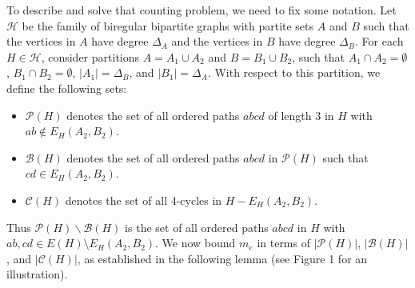 \documentclass[11pt]{amsart}
\newcommand{\pp}{\mathcal{P}}
\newcommand{\cc}{\mathcal{C}}
\newcommand{\bb}{\mathcal{B}}
\newcommand{\hh}{\mathcal{H}}
\begin{document}
To describe and solve that counting problem, we need to fix some notation. Let $\mathcal{H}$ be the family of biregular bipartite graphs with partite sets $A$ and $B$ such that the vertices in $A$ have degree  $\Delta_A$ and the vertices in $B$ have degree $\Delta_B$. For each $H\in \hh$, consider partitions  $A=A_1 \cup A_2$ and $B=B_1 \cup B_2$, such that $A_1\cap A_2=\emptyset$, $B_1\cap B_2=\emptyset$, $|A_1| =\Delta_B$, and $|B_1| =\Delta_A$. With respect to this partition, we define the following sets:  
\begin{itemize} 
 
\item $\mathcal P(H)$ denotes the set of all ordered paths $abcd$ of length 3 in $H$ with $ab\notin  E_H(A_2,B_2)$.\medskip
\item $\mathcal B(H)$ denotes the set of all ordered paths $abcd$ in $\mathcal P(H)$ such that $cd\in E_H(A_2, B_2)$.\medskip
\item $\mathcal C(H)$ denotes the set of all 4-cycles in $H-E_H(A_2, B_2)$. 
\end{itemize}
Thus $\mathcal P(H)\backslash \mathcal B(H)$ is the set of all ordered paths $abcd$ in $H$ with $ab,cd\in  E(H)\setminus E_H(A_2,B_2)$. We now bound $m_e$ in terms of $|\pp(H)|$, $|\bb(H)|$, and $|\cc(H)|$, as established in the following lemma (see Figure 1 for an illustration).
\end{document}
